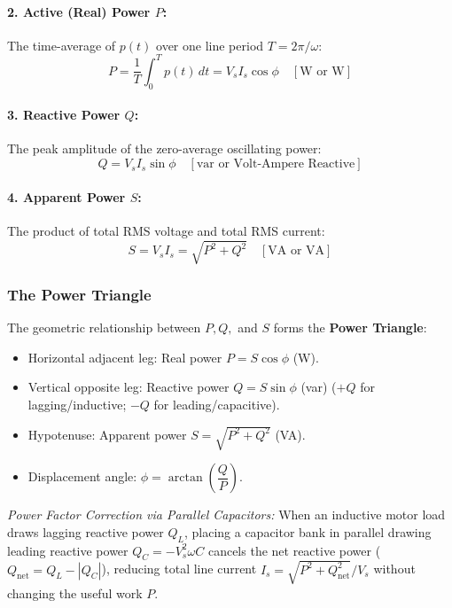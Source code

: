 \paragraph{2. Active (Real) Power $P$:} The time-average of $p(t)$ over one line period $T = 2\pi/\omega$:
\begin{equation}
P = \frac{1}{T} \int_0^T p(t)\,dt = V_s I_s \cos\phi \quad [\si{\watt}\text{ or W}]
\end{equation}

\paragraph{3. Reactive Power $Q$:} The peak amplitude of the zero-average oscillating power:
\begin{equation}
Q = V_s I_s \sin\phi \quad [\si{\text{var}}\text{ or Volt-Ampere Reactive}]
\end{equation}

\paragraph{4. Apparent Power $S$:} The product of total RMS voltage and total RMS current:
\begin{equation}
S = V_s I_s = \sqrt{P^2 + Q^2} \quad [\si{\volt\ampere}\text{ or VA}]
\end{equation}

\subsubsection{The Power Triangle}
The geometric relationship between $P, Q,$ and $S$ forms the \textbf{Power Triangle}:
\begin{itemize}
  \item Horizontal adjacent leg: Real power $P = S \cos\phi$ (W).
  \item Vertical opposite leg: Reactive power $Q = S \sin\phi$ (var) ($+Q$ for lagging/inductive; $-Q$ for leading/capacitive).
  \item Hypotenuse: Apparent power $S = \sqrt{P^2 + Q^2}$ (VA).
  \item Displacement angle: $\phi = \arctan\left(\dfrac{Q}{P}\right)$.
\end{itemize}
\textit{Power Factor Correction via Parallel Capacitors:} When an inductive motor load draws lagging reactive power $Q_L$, placing a capacitor bank in parallel drawing leading reactive power $Q_C = -V_s^2 \omega C$ cancels the net reactive power ($Q_{\mathrm{net}} = Q_L - |Q_C|$), reducing total line current $I_s = \sqrt{P^2 + Q_{\mathrm{net}}^2}/V_s$ without changing the useful work $P$.


